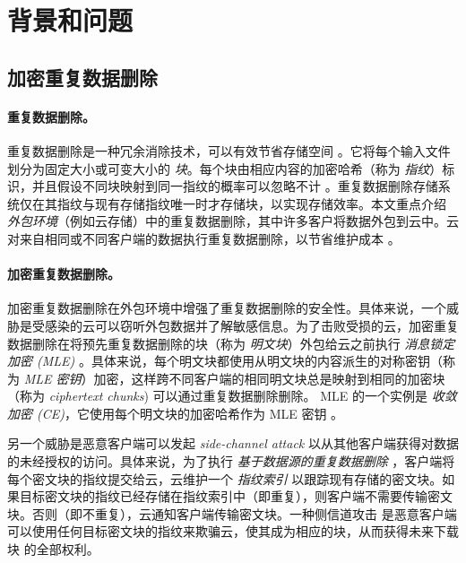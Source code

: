 \section{背景和问题}
\label{sec:background}

\subsection{加密重复数据删除}
\label{sub:basics}

\paragraph{重复数据删除。}
重复数据删除是一种冗余消除技术，可以有效节省存储空间 \cite{wallace12, meyer11}。它将每个输入文件划分为固定大小或可变大小的 {\em 块}。每个块由相应内容的加密哈希（称为 {\em 指纹}）标识，并且假设不同块映射到同一指纹的概率可以忽略不计 \cite{black06}。重复数据删除存储系统仅在其指纹与现有存储指纹唯一时才存储块，以实现存储效率。本文重点介绍 {\em 外包环境}（例如云存储）中的重复数据删除，其中许多客户将数据外包到云中。云对来自相同或不同客户端的数据执行重复数据删除，以节省维护成本 \cite{harnik10}。


\paragraph{加密重复数据删除。}
加密重复数据删除在外包环境中增强了重复数据删除的安全性。具体来说，一个威胁是受感染的云可以窃听外包数据并了解敏感信息。为了击败受损的云，加密重复数据删除在将预先重复数据删除的块（称为 {\em 明文块}）外包给云之前执行 {\em 消息锁定加密 (MLE)} \cite{bellare13a, bellare13b}。具体来说，每个明文块都使用从明文块的内容派生的对称密钥（称为 {\em MLE 密钥}）加密，这样跨不同客户端的相同明文块总是映射到相同的加密块（称为 {\em ciphertext chunks}) 可以通过重复数据删除删除。 MLE 的一个实例是 {\em 收敛加密 (CE)}，它使用每个明文块的加密哈希作为 MLE 密钥 \cite{douceur02}。

另一个威胁是恶意客户端可以发起 {\em side-channel attack} \cite{harnik10, halevi11} 以从其他客户端获得对数据的未经授权的访问。具体来说，为了执行 {\em 基于数据源的重复数据删除} \cite{harnik10}，客户端将每个密文块的指纹提交给云，云维护一个 {\em 指纹索引} 以跟踪现有存储的密文块。如果目标密文块的指纹已经存储在指纹索引中（即重复），则客户端不需要传输密文块。否则（即不重复），云通知客户端传输密文块。一种侧信道攻击 \cite{mulazzani11, halevi11} 是恶意客户端可以使用任何目标密文块的指纹来欺骗云，使其成为相应的块，从而获得未来下载块 \cite{mulazzani11} 的全部权利。


